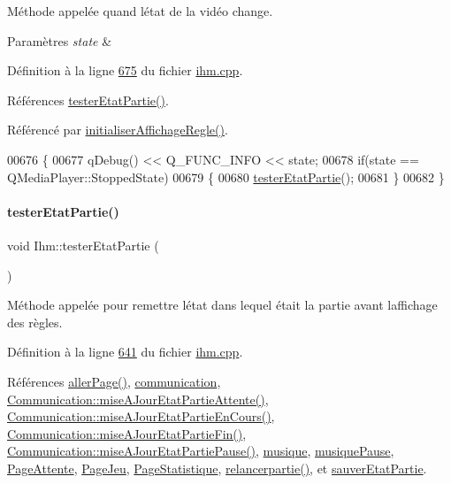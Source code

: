 Méthode appelée quand l\textquotesingle{}état de la vidéo change. 


\begin{DoxyParams}{Paramètres}
{\em state} & \\
\hline
\end{DoxyParams}


Définition à la ligne \hyperlink{ihm_8cpp_source_l00675}{675} du fichier \hyperlink{ihm_8cpp_source}{ihm.\+cpp}.



Références \hyperlink{ihm_8cpp_source_l00641}{tester\+Etat\+Partie()}.



Référencé par \hyperlink{ihm_8cpp_source_l00605}{initialiser\+Affichage\+Regle()}.


\begin{DoxyCode}
00676 \{
00677     qDebug() << Q\_FUNC\_INFO << state;
00678     \textcolor{keywordflow}{if}(state == QMediaPlayer::StoppedState)
00679     \{
00680         \hyperlink{class_ihm_a8dbd08db43f7c80ca7266cc6b162f571}{testerEtatPartie}();
00681     \}
00682 \}
\end{DoxyCode}
\mbox{\label{class_ihm_a8dbd08db43f7c80ca7266cc6b162f571}} 
\paragraph{\texorpdfstring{tester\+Etat\+Partie()}{testerEtatPartie()}}
{\footnotesize\ttfamily void Ihm\+::tester\+Etat\+Partie (\begin{DoxyParamCaption}{ }\end{DoxyParamCaption})\hspace{0.3cm}{\ttfamily [private]}}



Méthode appelée pour remettre l\textquotesingle{}état dans lequel était la partie avant l\textquotesingle{}affichage des règles. 



Définition à la ligne \hyperlink{ihm_8cpp_source_l00641}{641} du fichier \hyperlink{ihm_8cpp_source}{ihm.\+cpp}.



Références \hyperlink{ihm_8cpp_source_l00429}{aller\+Page()}, \hyperlink{ihm_8h_source_l00054}{communication}, \hyperlink{communication_8cpp_source_l00382}{Communication\+::mise\+A\+Jour\+Etat\+Partie\+Attente()}, \hyperlink{communication_8cpp_source_l00415}{Communication\+::mise\+A\+Jour\+Etat\+Partie\+En\+Cours()}, \hyperlink{communication_8cpp_source_l00404}{Communication\+::mise\+A\+Jour\+Etat\+Partie\+Fin()}, \hyperlink{communication_8cpp_source_l00393}{Communication\+::mise\+A\+Jour\+Etat\+Partie\+Pause()}, \hyperlink{ihm_8h_source_l00056}{musique}, \hyperlink{ihm_8h_source_l00057}{musique\+Pause}, \hyperlink{ihm_8h_source_l00074}{Page\+Attente}, \hyperlink{ihm_8h_source_l00076}{Page\+Jeu}, \hyperlink{ihm_8h_source_l00077}{Page\+Statistique}, \hyperlink{ihm_8cpp_source_l00539}{relancerpartie()}, et \hyperlink{ihm_8h_source_l00059}{sauver\+Etat\+Partie}.



